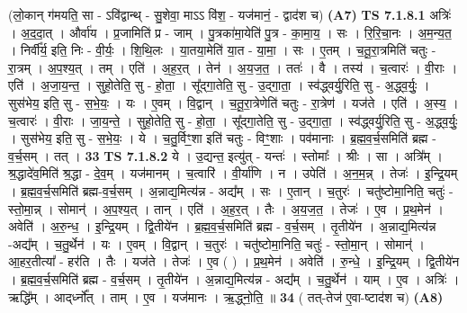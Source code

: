 \documentclass[17pt]{extarticle}
\begin{document}
                  \newline
                      (लो॒कान् ग॑मयति॒ सा - ऽवि॑द्वान्थ् - सु॒शेवा॒ माऽऽ वि॑श॒ - यज॑मानं॒ - द्वाद॑श च)  \textbf{(A7)} \newline \newline
                                \textbf{ TS 7.1.8.1} \newline
                  अत्रिः॑ । अ॒द॒दा॒त् । और्वा॑य । प्र॒जामिति॑ प्र - जाम् । पु॒त्रका॑मा॒येति॑ पु॒त्र - का॒मा॒य॒ । सः । रि॒रि॒चा॒नः । अ॒म॒न्य॒त॒ । निर्वी᳚र्य॒ इति॒ निः - वी॒र्यः॒ । शि॒थि॒लः । या॒तया॒मेति॑ या॒त - या॒मा॒ । सः । ए॒तम् । च॒तू॒रा॒त्रमिति॑ चतुः - रा॒त्रम् । अ॒प॒श्य॒त् । तम् । एति॑ । अ॒ह॒र॒त् । तेन॑ । अ॒य॒ज॒त॒ । ततः॑ । वै । तस्य॑ । च॒त्वारः॑ । वी॒राः । एति॑ । अ॒जा॒य॒न्त॒ । सुहो॒तेति॒ सु - हो॒ता॒ । सू᳚द्गा॒तेति॒ सु - उ॒द्गा॒ता॒ । स्व॑द्ध्वर्यु॒रिति॒ सु - अ॒द्ध्व॒र्युः॒ । सुस॑भेय॒ इति॒ सु - स॒भे॒यः॒ । यः । ए॒वम् । वि॒द्वान् । च॒तू॒रा॒त्रेणेति॑ चतुः - रा॒त्रेण॑ । यज॑ते । एति॑ । अ॒स्य॒ । च॒त्वारः॑ । वी॒राः । जा॒य॒न्ते॒ । सुहो॒तेति॒ सु - हो॒ता॒ । सू᳚द्गा॒तेति॒ सु - उ॒द्गा॒ता॒ । स्व॑द्ध्वर्यु॒रिति॒ सु - अ॒द्ध्व॒र्युः॒ । सुस॑भेय॒ इति॒ सु - स॒भे॒यः॒ । ये । च॒तु॒र्विꣳ॒॒शा इति॑ चतुः - विꣳ॒॒शाः । पव॑मानाः । ब्र॒ह्म॒व॒र्च॒समिति॑ ब्रह्म - व॒र्च॒सम् । तत् । \textbf{  33} \newline
                  \newline
                                \textbf{ TS 7.1.8.2} \newline
                  ये । उ॒द्यन्त॒ इत्यु॑त् - यन्तः॑ । स्तोमाः᳚ । श्रीः । सा । अत्रि᳚म् । श्र॒द्धादे॑व॒मिति॑ श्र॒द्धा - दे॒व॒म् । यज॑मानम् । च॒त्वारि॑ । वी॒र्या॑णि । न । उपेति॑ । अ॒न॒म॒न्न् । तेजः॑ । इ॒न्द्रि॒यम् । ब्र॒ह्म॒व॒र्च॒समिति॑ ब्रह्म-व॒र्च॒सम् । अ॒न्नाद्य॒मित्य॑न्न - अद्य᳚म् । सः । ए॒तान् । च॒तुरः॑ । चतु॑ष्टोमा॒निति॒ चतुः॑ - स्तो॒मा॒न्न् । सोमान्॑ । अ॒प॒श्य॒त् । तान् । एति॑ । अ॒ह॒र॒त् । तैः । अ॒य॒ज॒त॒ । तेजः॑ । ए॒व । प्र॒थ॒मेन॑ । अवेति॑ । अ॒रु॒न्ध॒ । इ॒न्द्रि॒यम् । द्वि॒तीये॑न । ब्र॒ह्म॒व॒र्च॒समिति॑ ब्रह्म - व॒र्च॒सम् । तृ॒तीये॑न । अ॒न्नाद्य॒मित्य॑न्न -अद्य᳚म् । च॒तु॒र्थेन॑ । यः । ए॒वम् । वि॒द्वान् । च॒तुरः॑ । चतु॑ष्टोमा॒निति॒ चतुः॑ - स्तो॒मा॒न् । सोमान्॑ । आ॒हर॒तीत्या᳚ - हर॑ति । तैः । यज॑ते । तेजः॑ । ए॒व ( ) । प्र॒थ॒मेन॑ । अवेति॑ । रु॒न्धे॒ । इ॒न्द्रि॒यम् । द्वि॒तीये॑न । ब्र॒ह्म॒व॒र्च॒समिति॑ ब्रह्म - व॒र्च॒सम् । तृ॒तीये॑न । अ॒न्नाद्य॒मित्य॑न्न - अद्य᳚म् । च॒तु॒र्थेन॑ । याम् । ए॒व । अत्रिः॑ । ऋद्धि᳚म् । आद्‌र्ध्नो᳚त् । ताम् । ए॒व । यज॑मानः । ऋ॒द्ध्नो॒ति॒ ॥ \textbf{  34} \newline
                  \newline
                      ( तत्-तेज॑ ए॒वा-ष्टाद॑श च)  \textbf{(A8)} \newline \newline
\end{document}
